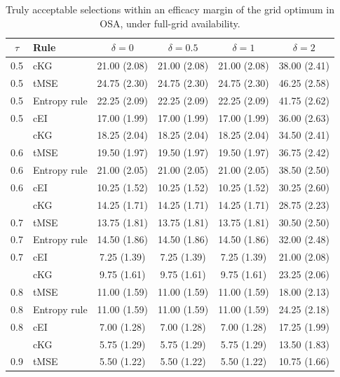 \begin{table}[H]
\revisioncolor
\centering
\footnotesize
\setlength{\tabcolsep}{5pt}
\caption{Truly acceptable selections within an efficacy margin of the grid optimum in OSA, under full-grid availability.}
\label{tab:nearoptimal}
\begin{tabular}{@{}clcccc@{}}
\toprule
$\tau$ & Rule & $\delta=0$ & $\delta=0.5$ & $\delta=1$ & $\delta=2$ \\
\midrule
0.5 & cKG & 21.00 (2.08) & 21.00 (2.08) & 21.00 (2.08) & 38.00 (2.41) \\
0.5 & tMSE & 24.75 (2.30) & 24.75 (2.30) & 24.75 (2.30) & 46.25 (2.58) \\
0.5 & Entropy rule & 22.25 (2.09) & 22.25 (2.09) & 22.25 (2.09) & 41.75 (2.62) \\
0.5 & cEI & 17.00 (1.99) & 17.00 (1.99) & 17.00 (1.99) & 36.00 (2.63) \\
\addlinespace[2pt]
0.6 & cKG & 18.25 (2.04) & 18.25 (2.04) & 18.25 (2.04) & 34.50 (2.41) \\
0.6 & tMSE & 19.50 (1.97) & 19.50 (1.97) & 19.50 (1.97) & 36.75 (2.42) \\
0.6 & Entropy rule & 21.00 (2.05) & 21.00 (2.05) & 21.00 (2.05) & 38.50 (2.50) \\
0.6 & cEI & 10.25 (1.52) & 10.25 (1.52) & 10.25 (1.52) & 30.25 (2.60) \\
\addlinespace[2pt]
0.7 & cKG & 14.25 (1.71) & 14.25 (1.71) & 14.25 (1.71) & 28.75 (2.23) \\
0.7 & tMSE & 13.75 (1.81) & 13.75 (1.81) & 13.75 (1.81) & 30.50 (2.50) \\
0.7 & Entropy rule & 14.50 (1.86) & 14.50 (1.86) & 14.50 (1.86) & 32.00 (2.48) \\
0.7 & cEI & 7.25 (1.39) & 7.25 (1.39) & 7.25 (1.39) & 21.00 (2.08) \\
\addlinespace[2pt]
0.8 & cKG & 9.75 (1.61) & 9.75 (1.61) & 9.75 (1.61) & 23.25 (2.06) \\
0.8 & tMSE & 11.00 (1.59) & 11.00 (1.59) & 11.00 (1.59) & 18.00 (2.13) \\
0.8 & Entropy rule & 11.00 (1.59) & 11.00 (1.59) & 11.00 (1.59) & 24.25 (2.18) \\
0.8 & cEI & 7.00 (1.28) & 7.00 (1.28) & 7.00 (1.28) & 17.25 (1.99) \\
\addlinespace[2pt]
0.9 & cKG & 5.75 (1.29) & 5.75 (1.29) & 5.75 (1.29) & 13.50 (1.83) \\
0.9 & tMSE & 5.50 (1.22) & 5.50 (1.22) & 5.50 (1.22) & 10.75 (1.66) \\

\end{tabular}
\end{table}
